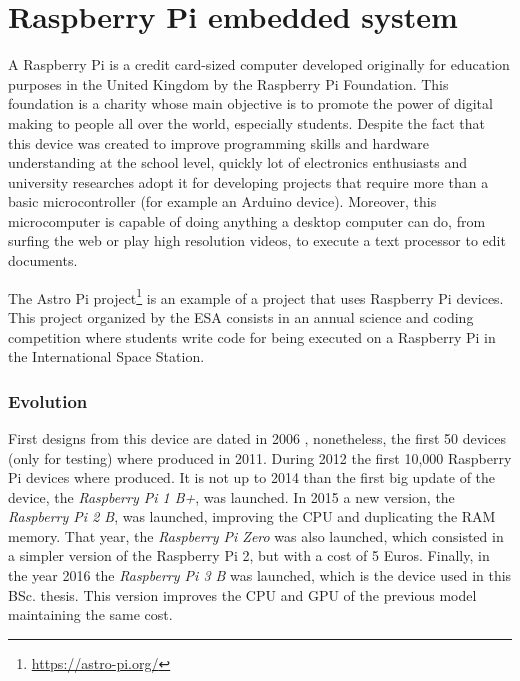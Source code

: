\section{Raspberry Pi embedded system}

A Raspberry Pi \cite{RaspberryPi} is a credit card-sized computer developed originally for education purposes in the United Kingdom by the Raspberry Pi Foundation. This foundation is a charity whose main objective is to promote the power of digital making to people all over the world, especially students. Despite the fact that this device was created to improve programming skills and hardware understanding at the school level, quickly lot of electronics enthusiasts and university researches adopt it for developing projects that require more than a basic microcontroller (for example an Arduino device). Moreover, this microcomputer is capable of doing anything a desktop computer can do, from surfing the web or play high resolution videos, to execute a text processor to edit documents.

The Astro Pi project\footnote{\url{https://astro-pi.org/}} is an example of a project that uses Raspberry Pi devices. This project organized by the \ac{ESA} consists in an annual science and coding competition where students write code for being executed on a Raspberry Pi in the International Space Station.

\subsubsection{Evolution}
First designs from this device are dated in 2006 \cite{Upt11}, nonetheless, the first 50 devices (only for testing) where produced in 2011. During 2012 the first 10,000 Raspberry Pi devices where produced. It is not up to 2014 than the first big update of the device, the \textit{Raspberry Pi 1 B+}, was launched. In 2015 a new version, the \textit{Raspberry Pi 2 B}, was launched, improving the \ac{CPU} and duplicating the RAM memory. That year, the \textit{Raspberry Pi Zero} was also launched, which consisted in a simpler version of the Raspberry Pi 2, but with a cost of 5 Euros. Finally, in the year 2016 the \textit{Raspberry Pi 3 B} was launched, which is the device used in this \ac{BSc.} thesis. This version improves the \ac{CPU} and \ac{GPU} of the previous model maintaining the same cost.  


